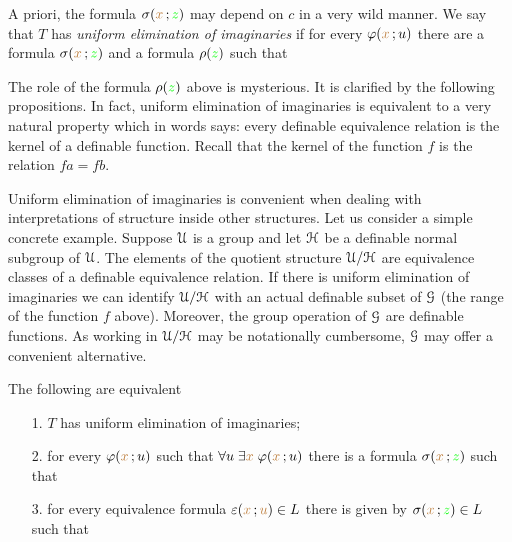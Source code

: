 \documentclass[creche.tex]{subfiles}
\begin{document}

A priori, the formula $\sigma({\color{brown} x}\,;{\color{green} z})$ may depend on $c$ in a very wild manner.
We say that $T$ has \emph{uniform elimination of imaginaries\/} if for every $\varphi({\color{brown} x}\,;u)$ there are a formula $\sigma({\color{brown} x}\,;{\color{green} z})$ and a formula $\rho({\color{green} z})$ such that 


The role of the formula $\rho({\color{green} z})$ above is mysterious.
It is clarified by the following propositions.
In fact, uniform elimination of imaginaries is equivalent to a very natural property which in words says: every definable equivalence relation is the kernel of a definable function.
Recall that the kernel of the function $f$ is the relation $fa=fb$.

Uniform elimination of imaginaries is convenient when dealing with interpretations of structure inside other structures.
Let us consider a simple concrete example.
Suppose $\EuScript U$ is a group and let $\EuScript H$ be a definable normal subgroup of $\EuScript U$.
The elements of the quotient structure $\EuScript U/\EuScript H$ are equivalence classes of a definable equivalence relation.
If there is uniform elimination of imaginaries we can identify $\EuScript U/\EuScript H$ with an actual definable subset of $\EuScript G$ (the range of the function $f$ above).
Moreover, the group operation of $\EuScript G$ are definable functions.
As working in $\EuScript U/\EuScript H$ may be notationally cumbersome, $\EuScript G$ may offer a convenient alternative.

\begin{proposition}\label{prop_uei_standard}
The following are equivalent
\begin{itemize}
\item[1.] $T$ has uniform elimination of imaginaries;
\end{itemize}
\begin{itemize}
\item[2.] for every $\varphi({\color{brown} x}\,;u)$ such that  $\forall u\;\exists{\color{brown}x}\;\varphi({\color{brown} x}\,;u)$ there is a formula $\sigma({\color{brown} x}\,;{\color{green} z})$ such that 
\end{itemize}


\begin{itemize}
\item[3.] for every equivalence formula $\varepsilon({\color{brown} x}\,;{\color{brown} u})\in L$ there is given by $\sigma({\color{brown} x}\,;{\color{green} z})\in L$ such that
\end{itemize}



\end{proposition}
\end{document}
